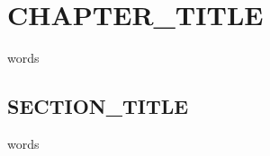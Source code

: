 \chapter{CHAPTER_TITLE} \label{ch:chpater_label}%

words  

\section{SECTION_TITLE} \label{sec:SECTION_LABEL} %

words
